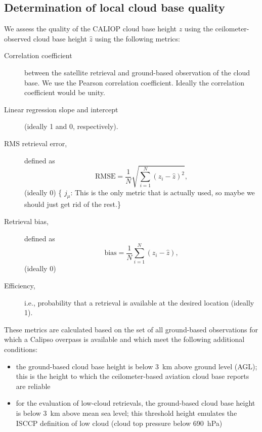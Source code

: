\documentclass[amt,manuscript]{copernicus}\usepackage[]{graphicx}\usepackage[]{color}
\newcommand{\hlnum}[1]{\textcolor[rgb]{0.686,0.059,0.569}{#1}}%
\newcommand\comment[2]{\{\hlnum{ \textit{#1}: #2}\}}
\newcommand\commentjm[1]{\comment{$j_\mu$}{#1}}
\begin{document}
\subsection{Determination of local cloud base quality}
\label{sec:algorithm:qual}
We assess the quality of the CALIOP cloud base height $z$ using the
ceilometer-observed cloud base height $\hat{z}$ using the following
metrics: 
\begin{description}
\item[Correlation coefficient] between the satellite retrieval and ground-based
  observation of the cloud base.  We use the Pearson correlation coefficient.
  Ideally the correlation coefficient would be unity.  
\item[Linear regression slope and intercept] (ideally 1 and 0, respectively).  
\item[RMS retrieval error,] defined as
  \begin{equation}
    \label{eq:rmse}
    \mbox{RMSE} = \frac{1}{N}\sqrt{\sum\limits_{i = 1}^{N}\left(z_i - \hat{z}\right)^2},
  \end{equation}
  (ideally 0) \commentjm{This is the only metric that is actually used, so maybe
    we should just get rid of the rest.}
\item[Retrieval bias,] defined as
  \begin{equation}
    \label{eq:bias}
    \mbox{bias} = \frac{1}{N}\sum\limits_{i = 1}^{N}\left(z_i - \hat{z}\right),
  \end{equation}(ideally 0)
\item[Efficiency,] i.e., probability that a retrieval is available at the
  desired location (ideally 1).
\end{description}

These metrics are calculated based on the set of all ground-based observations
for which a Calipso overpass is available and which meet the following
additional conditions:
\begin{itemize}
\item the ground-based cloud base height is below 3~km above ground level (AGL);
  this is the height to which the ceilometer-based aviation cloud base reports
  are reliable
\item for the evaluation of low-cloud retrievals, the ground-based cloud base
  height is below 3~km above mean sea level; this threshold height emulates the
  ISCCP definition of low cloud (cloud top pressure below 690~hPa)
\end{itemize}
\end{document}

